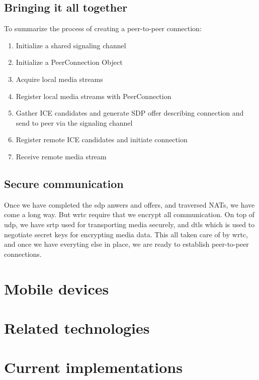 \subsection{Bringing it all together}
To summarize the process of creating a peer-to-peer connection:

\begin{enumerate}
\item{Initialize a shared signaling channel}
\item{Initialize a PeerConnection Object}
\item{Acquire local media streams}
\item{Register local media streams with PeerConnection}
\item{Gather ICE candidates and generate SDP offer describing connection and send to peer via the signaling channel}
\item{Register remote ICE candidates and initiate connection}
\item{Receive remote media stream}
\end{enumerate} 


\subsection{Secure communication}
Once we have completed the \gls{sdp} anwers and offers, and traversed NATs, we have come a long way. But \gls{wrtc} require that we encrypt all communication. On top of \gls{udp}, we have \gls{srtp} used for transporting media securely, and \gls{dtls} which is used to negotiate secret keys for encrypting media data. This all taken care of by \gls{wrtc}, and once we have everyting else in place, we are ready to establish peer-to-peer connections.

\section{Mobile devices}


\section{Related technologies}

\section{Current implementations}

